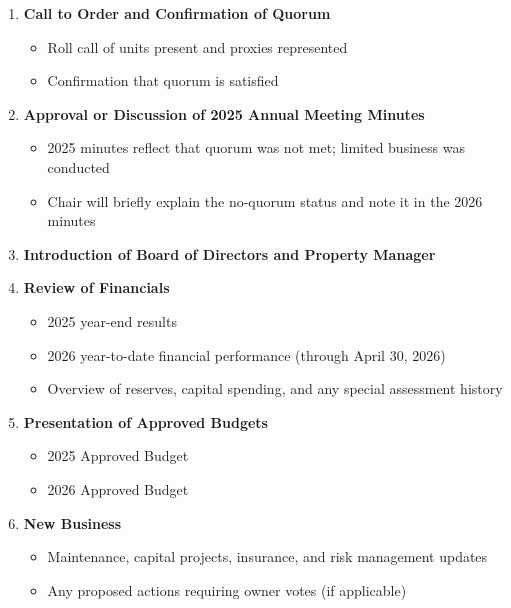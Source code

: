 \documentclass[11pt]{article}
\newcommand{\strong}[1]{\textbf{#1}}
\begin{document}
\begin{enumerate}[leftmargin=1.4em]
    \item \strong{Call to Order and Confirmation of Quorum}
    \begin{itemize}[leftmargin=1.1em]
        \item Roll call of units present and proxies represented
        \item Confirmation that quorum is satisfied
    \end{itemize}

    \item \strong{Approval or Discussion of 2025 Annual Meeting Minutes}
    \begin{itemize}[leftmargin=1.1em]
        \item 2025 minutes reflect that quorum was not met; limited business was conducted
        \item Chair will briefly explain the no-quorum status and note it in the 2026 minutes
    \end{itemize}

    \item \strong{Introduction of Board of Directors and Property Manager}

    \item \strong{Review of Financials}
    \begin{itemize}[leftmargin=1.1em]
        \item 2025 year-end results
        \item 2026 year-to-date financial performance (through April 30, 2026)
        \item Overview of reserves, capital spending, and any special assessment history
    \end{itemize}

    \item \strong{Presentation of Approved Budgets}
    \begin{itemize}[leftmargin=1.1em]
        \item 2025 Approved Budget
        \item 2026 Approved Budget
    \end{itemize}

    \item \strong{New Business}
    \begin{itemize}[leftmargin=1.1em]
        \item Maintenance, capital projects, insurance, and risk management updates
        \item Any proposed actions requiring owner votes (if applicable)
    \end{itemize}


\end{enumerate}
\end{document}
